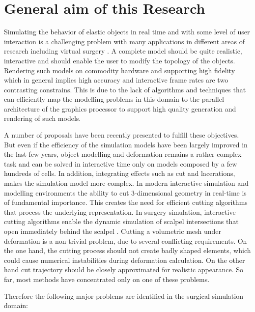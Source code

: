 

\label{chapter:introduction}
\section{General aim of this Research}
Simulating the behavior of elastic objects in real time and with some level of user interaction is a challenging problem 
with many applications in different areas of research including virtual surgery \cite{Meier2005}. 
A complete model should be quite realistic, interactive and should enable the user to modify the topology of the objects.
Rendering such models on commodity hardware and supporting high fidelity which in general implies high 
accuracy and interactive frame rates are two contrasting constrains. This is due 
to the lack of algorithms and techniques that can efficiently map the modelling problems in this domain to the 
parallel architecture of the graphics processor to support high quality generation and rendering of such models. 

A number of proposals have been recently presented to fulfill these objectives. But even if the efficiency
of the simulation models have been largely improved in the last few years, object modelling and deformation remains a rather 
complex task and can be solved in interactive time only on models composed by a few hundreds of cells. In addition, integrating effects
such as cut and lacerations, makes the simulation model more complex. In modern interactive simulation and modelling environments the ability to 
cut 3-dimensional geometry in real-time is of fundamental importance. This creates the need for efficient cutting algorithms that process the 
underlying representation. In surgery simulation, interactive cutting algorithms enable the dynamic simulation of scalpel intersections that open 
immediately behind the scalpel \cite{Nienhuys2001a}. Cutting a volumetric mesh under deformation is a non-trivial problem, due to several conflicting
requirements. On the one hand, the cutting process should not create badly shaped elements, which could cause numerical instabilities during deformation
calculation. On the other hand cut trajectory should be closely approximated for realistic appearance. So far, most methods have concentrated only on 
one of these problems. 

Therefore the following major problems are identified in the surgical simulation domain:

